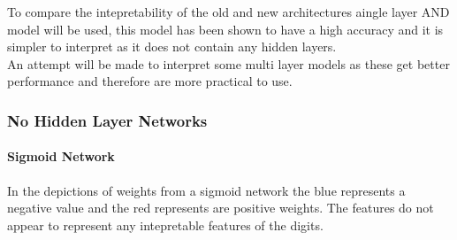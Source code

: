 To compare the intepretability of the old and new architectures aingle layer AND model will be used, this model has been shown to have a high accuracy and it is simpler to interpret as it does not contain any hidden layers.\\

An attempt will be made to interpret some multi layer models as these get better performance and therefore are more practical to use.

\subsubsection{No Hidden Layer Networks}
\paragraph{Sigmoid Network}
In the depictions of weights from a sigmoid network the blue represents a negative value and the red represents are positive weights. The features do not appear to represent any intepretable features of the digits.

